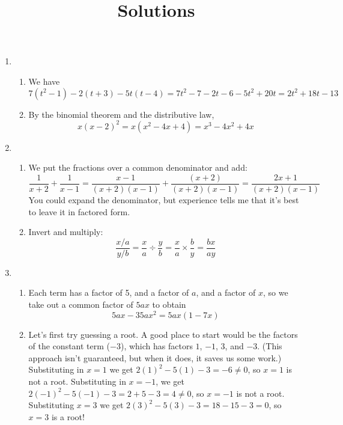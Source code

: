 \documentclass{article}
\title{\commonPSTitleZeroZeroOne\ Solutions}
\author{\commonAuthor}
\date{\commonDateZeroZeroOne}
\begin{document}
\maketitle
\begin{enumerate}
\item %
  \begin{enumerate}
  \item We have
    \begin{equation*}
      7(t^2-1)-2(t+3)-5t(t-4)
      = 7t^2 - 7 -2t -6 -5t^2+20t
      = 2t^2 +18t -13
    \end{equation*}
  \item By the binomial theorem and the distributive law,
    \begin{equation*}
      x(x-2)^2 = x(x^2-4x+4) = x^3 -4x^2 + 4x
    \end{equation*}
  \end{enumerate}
\item %
  \begin{enumerate}
  \item We put the fractions over a common denominator and add:
    \begin{equation*}
      \frac{1}{x+2} + \frac{1}{x-1}
      = \frac{x-1}{(x+2)(x-1)} + \frac{(x+2)}{(x+2)(x-1)}
      = \frac{2x+1}{(x+2)(x-1)}
    \end{equation*}
    You could expand the denominator, but experience tells me that
    it's best to leave it in factored form.
  \item Invert and multiply:
    \begin{equation*}
      \frac{x/a}{y/b} = \frac{x}{a} \div \frac{y}{b}
      = \frac{x}{a} \times \frac{b}{y} = \frac{bx}{ay}
    \end{equation*}
  \end{enumerate}
\item %
  \begin{enumerate}
  \item Each term has a factor of 5, and a factor of $a$, and a factor
    of $x$, so we take out a common factor of $5ax$ to obtain
    \begin{equation*}
      5ax - 35ax^2 = 5ax(1-7x)
    \end{equation*}
  \item\label{prob:quadAnonzero} %
    Let's first try guessing a root.  A good place to start would be the
    factors of the constant term ($-3$), which has factors $1$, $-1$, $3$, and
    $-3$.  (This approach isn't guaranteed, but when it does, it saves
    us some work.)  Substituting in $x=1$ we get $2(1)^2-5(1)-3=-6\ne 0$, so
    $x=1$ is not a root.  Substituting in $x=-1$, we get $2(-1)^2-5(-1)-3=
    2+5-3=4\ne 0$, so $x=-1$ is not a root.  Substituting $x=3$ we get
    $2(3)^2-5(3)-3=18-15-3=0$, so $x=3$ is a root!


\end{enumerate}
\end{enumerate}
\end{document}
